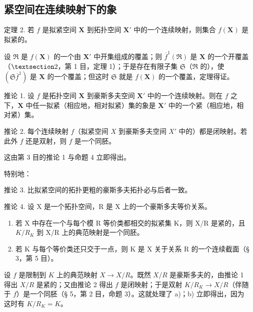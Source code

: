 \subsection{紧空间在连续映射下的象}

定理 2. 若 \(f\) 是拟紧空间 \(\mathbf{X}\) 到拓扑空间 \(\mathbf{X}'\) 中的一个连续映射，则集合 \(f(\mathbf{X})\) 是拟紧的。

设 \(\Re\) 是 \(f(\mathbf{X})\) 的一个由 \(\mathbf{X}'\) 中开集组成的覆盖；则 \(\overline{f}^{1}(\Re)\) 是 \(\mathbf{X}\) 的一个开覆盖（\(\S 2\)，第 1 目，定理 1）；于是存在有限子集 \(\mathfrak{S}\)（\(\Re\) 的），使 \((\mathfrak{S}\overline{f}^{1})\) 是 \(\mathbf{X}\) 的一个覆盖；但这时 \(\mathfrak{S}\) 就是 \(f(\mathbf{X})\) 的一个覆盖，定理得证。

推论 1. 设 \(f\) 是拓扑空间 \(\mathbf{X}\) 到豪斯多夫空间 \(\mathbf{X}'\) 中的一个连续映射。则在 \(f\) 之下，\(\mathbf{X}\) 中任一拟紧（相应地，相对拟紧）集的象是 \(\mathbf{X}'\) 中的一个紧（相应地，相对紧）集。

推论 2. 每个连续映射 \(f\)（拟紧空间 \(X\) 到豪斯多夫空间 \(X'\) 中的）都是闭映射。若此外 \(f\) 还是双射，则 \(f\) 是一个同胚。

这由第 3 目的推论 1 与命题 4 立即得出。

特别地：

推论 3. 比拟紧空间的拓扑更粗的豪斯多夫拓扑必与后者一致。

推论 4. 设 X 是一个拓扑空间，R 是 X 上的一个豪斯多夫等价关系。

\begin{enumerate}
\def\labelenumi{\alph{enumi})}
\item
  若 X 中存在一个与每个模 R 等价类都相交的拟紧集 K，则 X/R 是紧的，且 \(K/R_{K}\) 到 X/R 上的典范映射是一个同胚。
\item
  若 K 与每个等价类还只交于一点，则 K 是 X 关于关系 R 的一个连续截面（§ 3，第 5 目）。
\end{enumerate}

设 \(f\) 是限制到 \(K\) 上的典范映射 \(X \to X / R\)。既然 \(X / R\) 是豪斯多夫的，由推论 1 得出 \(X / R\) 是紧的；又由推论 2 得出 \(f\) 是闭映射；于是双射 \(K / R_K \to X / R\)（伴随于 \(f\)）是一个同胚（§ 5，第 2 目，命题 3）。这就处理了 a)；b) 立即得出，因为这时有 \(K / R_K = K\)。

